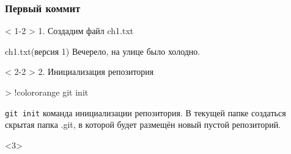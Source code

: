 \documentclass[9pt, aspectratio=1610]{beamer}
\begin{document}
\begin{frame}[fragile]\frametitle{Первый коммит}
	
	
		
	\begin{minipage}[t][\paperheight-3cm][b]{0.3\linewidth}
	\end{minipage}\hfill%
	\begin{minipage}[t][\paperheight-3cm][t]{0.68\linewidth}
			
		\begin{minipage}[t][5.2cm][t]{\linewidth}		
			
			\begin{onlyenv}< 1-2 >%
				1. Создадим файл ch1.txt
				\begin{block}{ch1.txt(версия 1)}
					Вечерело, на улице было холодно.
				\end{block}
			\end{onlyenv}%
			\begin{onlyenv}< 2-2 >%
				2. Инициализация репозитория
				
				\begin{VerbatimCmd}[gobble=5]
					
					> !color{orange} git init
					
				\end{VerbatimCmd}
				
				\begin{alertblock}{\Verb|git init|} \small
					команда инициализации репозитория. В текущей папке создаться скрытая папка .git, в которой будет размещён новый пустой репозиторий.
				\end{alertblock}
			\end{onlyenv}%
			\begin{onlyenv}<3>%
				

\end{onlyenv}
\end{minipage}
\end{minipage}
\end{frame}
\end{document}
